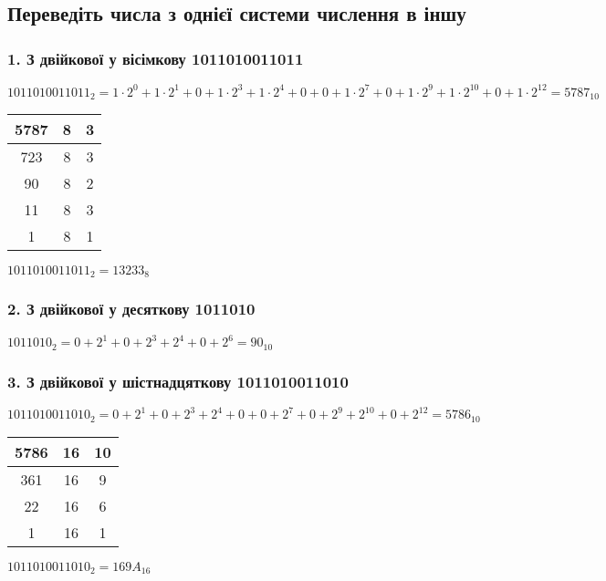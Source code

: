 \documentclass[14pt]{extreport}
\begin{document}
\pagestyle{empty}



\subsection*{Переведіть числа з однієї системи числення в іншу }

\subsubsection{1. З двійкової у вісімкову 1011010011011 }
$1011010011011_2=1\cdot2^0+1\cdot2^1+0+1\cdot2^3+1\cdot2^4+
0+0+1\cdot2^7+0+1\cdot2^9+1\cdot2^{10}+0+1\cdot2^{12}=5787_{10}$

\bigskip

\begin{tabular}{c|c|c}
	5787 & 8 & 3 \\
	\hline
	723 & 8 & 3 \\
	\hline
	90 & 8 & 2 \\
	\hline
	11 & 8 & 3 \\
	\hline
	1 & 8 & 1 \\
\end{tabular}
\hspace{.1\textwidth}
$1011010011011_2=13233_8$

\subsubsection{2. З двійкової у десяткову 1011010}
$1011010_2=0+2^1+0+2^3+2^4+0+2^6=90_{10}$

\subsubsection{3. З двійкової у шістнадцяткову 1011010011010}
$1011010011010_2=0+2^1+0+2^3+2^4+0+0+2^7+0+2^9+2^{10}+0+2^{12}=
5786_{10}$

\bigskip
\begin{tabular}{c|c|c}
	5786 & 16 & 10 \\
	\hline
	361 & 16 & 9 \\
	\hline
	22 & 16 & 6 \\
	\hline
	1 & 16 & 1 \\
\end{tabular}
\hspace{.1\textwidth}
$1011010011010_2=169A_{16}$ \\
\end{document}
